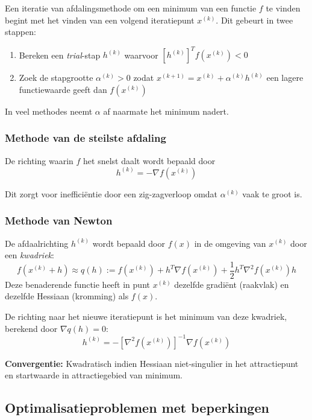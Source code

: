 \documentclass{article}
\begin{document}
	Een iteratie van afdalingsmethode om een minimum van een functie $f$ te vinden begint met het vinden van een volgend iteratiepunt $x^(k)$. Dit gebeurt in twee stappen:
	\begin{enumerate}
		\item Bereken een \textit{trial}-stap $h^{(k)}$ waarvoor $[h^{(k)}]^T f(x^{(k)}) < 0$
		\item Zoek de stapgrootte $\alpha^{(k)} > 0$ zodat $x^{(k+1)} = x^{(k)} + \alpha^{(k)} h^{(k)}$ een lagere functiewaarde geeft dan $f(x^{(k)})$
	\end{enumerate}


	In veel methodes neemt $\alpha$ af naarmate het minimum nadert.	
	
	\subsubsection{Methode van de steilste afdaling}
	
	De richting waarin $f$ het snelst daalt wordt bepaald door 
	$$
		h^{(k)} = -\nabla f(x^{(k)})
	$$
	
	Dit zorgt voor inefficiëntie door een zig-zagverloop omdat $\alpha^{(k)}$ vaak te groot is.	
	
	\subsubsection{Methode van Newton}
	
	De afdaalrichting $h^{(k)}$ wordt bepaald door $f(x)$ in de omgeving van $x^{(k)}$ door een \textit{kwadriek}:
	$$
		f(x^{(k)} + h) \approx q(h) := f(x^{(k)}) + h^T \nabla f(x^{(k)}) + \frac{1}{2} h^T \nabla^2 f(x^{(k)})h
	$$
	Deze benaderende functie heeft in punt $x^{(k)}$ dezelfde gradiënt (raakvlak) en dezelfde Hessiaan (kromming) als $f(x)$.
	
	De richting naar het nieuwe iteratiepunt is het minimum van deze kwadriek, berekend door $ \nabla q(h) = 0 $:
	$$
		h^{(k)} = -[\nabla^2f(x^{(k)})]^{-1} \nabla f(x^{(k)})
	$$
	
	\textbf{Convergentie:} Kwadratisch indien Hessiaan niet-singulier in het attractiepunt en startwaarde in attractiegebied van minimum.
	
	\subsection{Optimalisatieproblemen met beperkingen}
	
\end{document}
